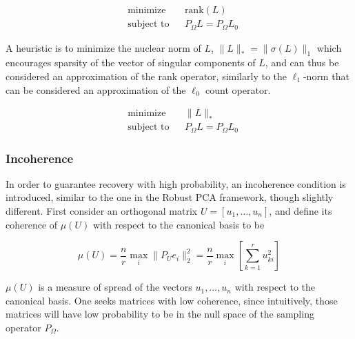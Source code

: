 \documentclass{../../common/projectreport}
\begin{document}
\begin{equation}
\begin{aligned}
&\text{minimize} && \text{rank}(L) \\
&\text{subject to} && P_\Omega L = P_\Omega L_0
\end{aligned}
\end{equation}


A heuristic is to minimize the nuclear norm of $L$, $\|L\|_* = \|\sigma(L)\|_1$ which encourages sparsity of the vector of singular components of $L$, and can thus be considered an approximation of the rank operator, similarly to the $\ell_1$-norm that can be considered an approximation of the $\ell_0$ count operator.

\begin{equation}
\begin{aligned}
&\text{minimize} && \|L\|_* \\
&\text{subject to} && P_\Omega L = P_\Omega L_0
\end{aligned}
\end{equation}


\subsubsection{Incoherence}

In order to guarantee recovery with high probability, an incoherence condition is introduced, similar to the one in the Robust PCA framework, though slightly different. First consider an orthogonal matrix $U = [u_1, \dots, u_n]$, and define its coherence of $\mu(U)$ with respect to the canonical basis to be

\begin{equation}
\mu(U) = \frac{n}{r} \max_i \|P_U e_i\|_2^2 = \frac{n}{r} \max_i \left[ \sum_{k=1}^r u_{ki}^2 \right]
\label{emc_incoherence}
\end{equation}

$\mu(U)$ is a measure of spread of the vectors $u_1, \dots, u_n$ with respect to the canonical basis. One seeks matrices with low coherence, since intuitively, those matrices will have low probability to be in the null space of the sampling operator $P_\Omega$.
\end{document}
